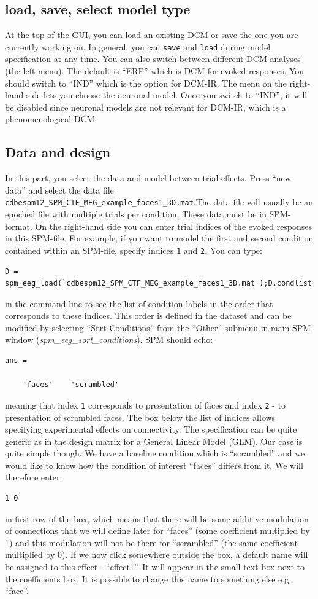 \subsection{load, save, select model type}
At the top of the GUI, you can load an existing DCM or save the one you are currently working on. In general, you can \texttt{save} and \texttt{load} during model specification at any time. You can also switch between different DCM analyses (the left menu). The default is ``ERP'' which is DCM for evoked responses. You should switch to ``IND'' which is the option for DCM-IR. The menu on the right-hand side lets you choose the neuronal model. Once you switch to ``IND'', it will be disabled since neuronal models are not relevant for DCM-IR, which is a phenomenological DCM.

\subsection{Data and design}
In this part, you select the data and model between-trial effects. Press ``new data'' and select the data file \texttt{cdbespm12\_\-SPM\_\-CTF\_\-MEG\_\-example\_\-faces1\_\-3D.mat}.The data file will usually be an epoched file with multiple trials per condition. These data must be in SPM-format. On the right-hand side you can enter trial indices of the evoked responses in this SPM-file. For example, if you want to model the first and second condition contained within an SPM-file, specify
indices \texttt{1} and \texttt{2}. You can type:
\begin{verbatim}
D = spm_eeg_load(`cdbespm12_SPM_CTF_MEG_example_faces1_3D.mat');D.condlist
\end{verbatim}
in the command line to see the list of condition labels in the order that corresponds to these indices. This order is defined in the dataset and can be modified by selecting ``Sort Conditions'' from the ``Other'' submenu in main SPM window (\textit{spm\_eeg\_sort\_conditions}). SPM should echo:
\begin{verbatim}
ans = 

    'faces'    'scrambled'
\end{verbatim}
meaning that index \texttt{1} corresponds to presentation of faces and index \texttt{2} - to presentation of scrambled faces. The box below the list of indices allows specifying experimental effects on connectivity. The specification can be quite generic as in the design matrix for a General Linear Model (GLM). Our case is quite simple though. We have a baseline condition which is ``scrambled'' and we would like to know how the condition of interest ``faces'' differs from it. We will therefore enter:
\begin{verbatim}
1 0
\end{verbatim}
in first row of the box, which means that there will be some additive modulation of connections that we will define later for ``faces''  (some coefficient multiplied by 1) and this modulation will not be there for ``scrambled'' (the same coefficient multiplied by 0). If we now click somewhere outside the box, a default name will be assigned to this effect - ``effect1''. It will appear in the small text box next to the coefficients box. It is possible to change this name to something else e.g. ``face''.

